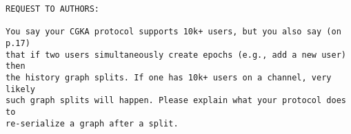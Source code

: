 \documentclass[letterpaper,10pt]{article}
\begin{document}
\begin{enumerate}[label=(\Alph*)]
\begin{verbatim}
REQUEST TO AUTHORS:

You say your CGKA protocol supports 10k+ users, but you also say (on p.17)
that if two users simultaneously create epochs (e.g., add a new user) then
the history graph splits. If one has 10k+ users on a channel, very likely
such graph splits will happen. Please explain what your protocol does to
re-serialize a graph after a split.
\end{verbatim}

\end{enumerate}




%



\clearpage
\newpage
\appendix
\end{document}
